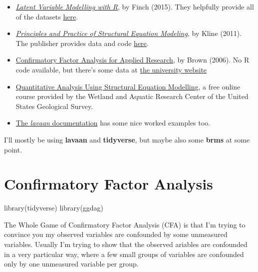 \documentclass[
  letterpaper,
  DIV=11,
  numbers=noendperiod]{scrreprt}
\newenvironment{Shaded}{\begin{snugshade}}{\end{snugshade}}
\newcommand{\FunctionTok}[1]{\textcolor[rgb]{0.28,0.35,0.67}{#1}}
\newcommand{\NormalTok}[1]{\textcolor[rgb]{0.00,0.23,0.31}{#1}}
\begin{document}
\begin{itemize}
\item
  \href{https://www.routledge.com/Latent-Variable-Modeling-with-R/Finch-French/p/book/9780415832458}{\emph{Latent
  Variable Modelling with R}}, by Finch (2015). They helpfully provide
  all of the datasets
  \href{https://www.routledge.com/Latent-Variable-Modeling-with-R/Finch-French/p/book/9780415832458}{here}.
\item
  \href{https://www.guilford.com/books/Principles-and-Practice-of-Structural-Equation-Modeling/Rex-Kline/9781462523344}{\emph{Principles
  and Practice of Structural Equation Modeling}}, by Kline (2011). The
  publisher provides data and code
  \href{https://www.guilford.com/companion-site/Principles-and-Practice-of-Structural-Equation-Modeling-Fourth-Edition/9781462523344}{here}.
\item
  \href{http://www.kharazmi-statistics.ir/Uploads/Public/book/Methodology\%20in\%20the\%20Social\%20Sciences.pdf}{Confirmatory
  Factor Analysis for Applied Research}, by Brown (2006). No R code
  available, but there's some data at
  \href{https://people.bu.edu/tabrown/cfabook.html}{the university
  website}
\item
  \href{https://www.usgs.gov/centers/wetland-and-aquatic-research-center/science/quantitative-analysis-using-structural-equation}{Quantitative
  Analysis Using Structural Equation Modelling}, a free online course
  provided by the Wetland and Aquatic Research Center of the United
  States Geological Survey.
\item
  \href{https://www.lavaan.ugent.be/tutorial/index.html}{The
  \emph{lavaan} documentation} has some nice worked examples too.
\end{itemize}

I'll mostly be using \textbf{lavaan} and \textbf{tidyverse}, but maybe
also some \textbf{brms} at some point.

\part{Confirmatory Factor Analysis}

\begin{Shaded}
\begin{Highlighting}[]
\FunctionTok{library}\NormalTok{(tidyverse)}
\FunctionTok{library}\NormalTok{(ggdag)}
\end{Highlighting}
\end{Shaded}

The Whole Game of Confirmatory Factor Analysis (CFA) is that I'm trying
to convince you my observed variables are confounded by some unmeasured
variables. Usually I'm trying to show that the observed ariables are
confounded in a very particular way, where a few small groups of
variables are confounded only by one unmeasured variable per group.
\end{document}
